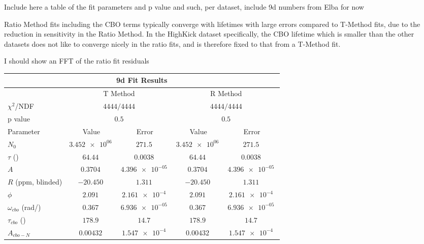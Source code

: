 Include here a table of the fit parameters and p value and such, per dataset, include 9d numbers from Elba for now



Ratio Method fits including the CBO terms typically converge with lifetimes with large errors compared to T-Method fits, due to the reduction in sensitivity in the Ratio Method. In the HighKick dataset specifically, the CBO lifetime which is smaller than the other datasets does not like to converge nicely in the ratio fits, and is therefore fixed to that from a T-Method fit.


I should show an FFT of the ratio fit residuals 


	\begin{table}[]
	\centering
	\setlength\tabcolsep{10pt}
	\renewcommand{\arraystretch}{1.2}
	\begin{tabular*}{.85\linewidth}{@{\extracolsep{\fill}}lcccc}
	  \hline
	  	\multicolumn{5}{c}{\textbf{9d Fit Results}} \\
	  \hline\hline
	  	& \multicolumn{2}{c}{T Method} & \multicolumn{2}{c}{R Method} \\
	  \hline\hline
	    $\chi^{2}$/NDF & \multicolumn{2}{c}{$4444/4444$} & \multicolumn{2}{c}{$4444/4444$} \\
	  	p value        & \multicolumn{2}{c}{$0.5$} & \multicolumn{2}{c}{$0.5$}  \\
	  \hline\hline
	  	Parameter & Value & Error & Value & Error \\
	  \hline
		$N_{0}$    			  		&  $\SI{3.452e+06}{}$ & $\SI{271.5}{}$ & $\SI{3.452e+06}{}$ & $\SI{271.5}{}$ \\
		$\tau$ (\mus{})   	    	&  $\SI{64.44}{}$ & $\SI{0.0038}{}$ & $\SI{64.44}{}$ & $\SI{0.0038}{}$ \\
		$A$    			 	  		&  $\SI{0.3704}{}$ & $\SI{4.396e-05}{}$ & $\SI{0.3704}{}$ & $\SI{4.396e-05}{}$ \\
		$R$ (ppm, blinded) 	  		&  $\SI{-20.450}{}$ & $\SI{1.311}{}$ & $\SI{-20.450}{}$ & $\SI{1.311}{}$ \\
		$\phi$   			  		&  $\SI{2.091}{}$ & $\SI{2.161e-4}{}$ & $\SI{2.091}{}$ & $\SI{2.161e-4}{}$ \\
		$\omega_{cbo}$ (rad/\mus{}) &  $\SI{0.367}{}$ & $\SI{6.936e-05}{}$ & $\SI{0.367}{}$ & $\SI{6.936e-05}{}$ \\
		$\tau_{cbo}$ (\mus{})       &  $\SI{178.9}{}$ & $\SI{14.7}{}$ & $\SI{178.9}{}$ & $\SI{14.7}{}$ \\
		$A_{cbo-N}$   	 	  		&  $\SI{0.00432}{}$ & $\SI{1.547e-4}{}$ & $\SI{0.00432}{}$ & $\SI{1.547e-4}{}$ \\

\end{tabular*}
\end{table}
